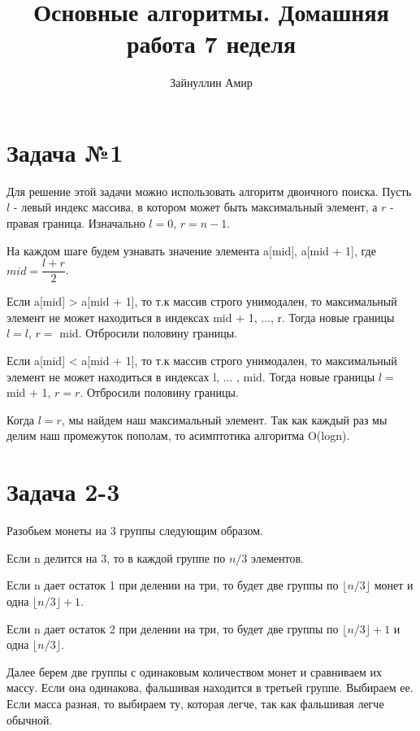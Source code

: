 \documentclass{article}
\begin{document}
\title{\textbf{Основные алгоритмы. Домашняя работа 7 неделя}}


\author{Зайнуллин Амир}
\maketitle

\section*{Задача №1}

Для решение этой задачи можно использовать алгоритм двоичного поиска. Пусть $l$ - левый индекс массива, в котором может быть максимальный элемент, а $r$ - правая граница. 
Изначально $l = 0$, $r = n - 1$.

На каждом шаге будем узнавать значение элемента a[mid], a[mid + 1], где $mid = \dfrac{l + r}{2}$. 

Если a[mid] > a[mid + 1], то т.к массив строго унимодален, то максимальный элемент не может находиться в индексах mid + 1, ..., r. Тогда новые границы $l = l$, $r =$ mid. Отбросили половину границы. 

Если a[mid] < a[mid + 1], то т.к массив строго унимодален, то максимальный элемент не может находиться в индексах l, ... , mid. Тогда новые границы $l =$ mid + 1, $r = r$. Отбросили половину границы. 

Когда $l = r$, мы найдем наш максимальный элемент. 
Так как каждый раз мы делим наш промежуток пополам, то асимптотика алгоритма O(logn).

\section*{Задача 2-3}

Разобьем монеты на 3 группы следующим образом. 

Если n делится на 3, то в каждой группе по $n / 3$ элементов. 

Если n дает остаток 1 при делении на три, то будет две группы по $\lfloor n/3\rfloor$ монет и одна $\lfloor n/3\rfloor + 1$. 

Если n дает остаток 2 при делении на три, то будет две группы по $\lfloor n/3\rfloor + 1$ и одна $\lfloor n/3\rfloor$.

Далее берем две группы с одинаковым количеством монет и сравниваем их массу. Если она одинакова, фальшивая находится в третьей группе. Выбираем ее. Если масса разная, то выбираем ту, которая легче, так как фальшивая легче обычной. 
\end{document}
